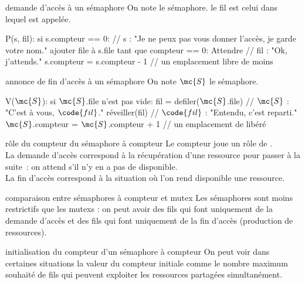 \begin{adjustwidth}{-3cm}{-3cm}
\begin{implementation}{demande d'accès à un sémaphore}
    On note  le sémaphore. le fil  est celui dans lequel  est appelée.
    \begin{lstLNat}
    P(s, fil):
        si s.compteur == 0: 
            // s : "Je ne peux pas vous donner l'accès, je garde votre nom."
            ajouter file à s.file
            tant que compteur == 0:
                Attendre // fil : "Ok, j'attends."
        s.compteur = s.compteur - 1 // un emplacement libre de moins
    \end{lstLNat}
\end{implementation}

\begin{implementation}{annonce de fin d'accès à un sémaphore}
    On note $\mc{S}$ le sémaphore.
    \begin{lstLNat}
    V($\mc{S}$):
        si $\mc{S}$.file n'est pas vide:
            fil = defiler($\mc{S}$.file) // $\mc{S}$ : "C'est à vous, $\code{fil}$."
            réveiller(fil) // $\code{fil}$ : "Entendu, c'est reparti."
        $\mc{S}$.compteur = $\mc{S}$.compteur + 1 // un emplacement de libéré
    \end{lstLNat}
\end{implementation}

\begin{remarque}{}{rôle du compteur du sémaphore à compteur}
    Le compteur joue un rôle de .\\
    La demande d'accès correspond à la récupération d'une ressource pour passer à la suite~: on attend s'il n'y en a pas de disponible.\\
    La fin d'accès correspond à la situation où l'on rend disponible une ressource.
\end{remarque}

\begin{remarque}{}{comparaison entre sémaphores à compteur et mutex}
    Les sémaphores sont moins restrictifs que les mutexs : on peut avoir des fils qui font uniquement de la demande d'accès et des fils qui font uniquement de la fin d'accès (production de ressources).
\end{remarque}

\begin{remarque}{}{initialisation du compteur d'un sémaphore à compteur}
    On peut voir dans certaines situations la valeur du compteur initiale comme le nombre maximum souhaité de fils qui peuvent exploiter les ressources partagées simultanément.
\end{remarque}


\end{adjustwidth}
